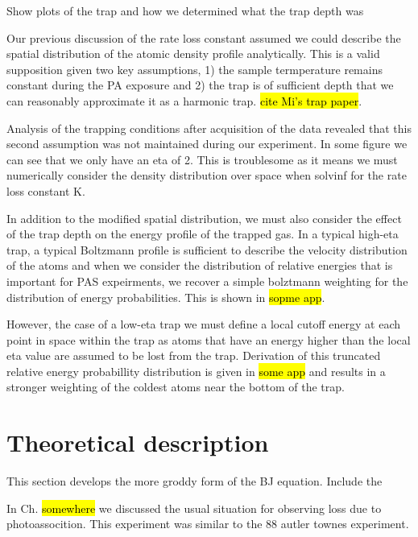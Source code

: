 Show plots of the trap and how we determined what the trap depth was

Our previous discussion of the rate loss constant assumed we could describe the spatial distribution of the atomic density profile analytically. This is a valid supposition given two key assumptions, 1) the sample termperature remains constant during the PA exposure and 2) the trap is of sufficient depth that we can reasonably approximate it as a harmonic trap. \hl{cite Mi's trap paper}.

Analysis of the trapping conditions after acquisition of the data revealed that this second assumption was not maintained during our experiment. In some figure we can see that we only have an eta of 2. This is troublesome as it means we must numerically consider the density distribution over space when solvinf for the rate loss constant K. 

In addition to the modified spatial distribution, we must also consider the effect of the trap depth on the energy profile of the trapped gas. In a typical high-eta trap, a typical Boltzmann profile is sufficient to describe the velocity distribution of the atoms and when we consider the distribution of relative energies that is important for PAS expeirments, we recover a simple bolztmann weighting for the distribution of energy probabilities. This is shown in \hl{sopme app}.

However, the case of a low-eta trap we must define a local cutoff energy at each point in space within the trap as atoms that have an energy higher than the local eta value are assumed to be lost from the trap. Derivation of this truncated relative energy probabillity distribution is given in \hl{some app} and results in a stronger weighting of the coldest atoms near the bottom of the trap.



\section{Theoretical description}
\label{sec:lowE_theory}

This section develops the more groddy form of the BJ equation. Include the 

In Ch. \hl{somewhere} we discussed the usual situation for observing loss due to photoassocition. This experiment was similar to the 88 autler townes experiment. 

